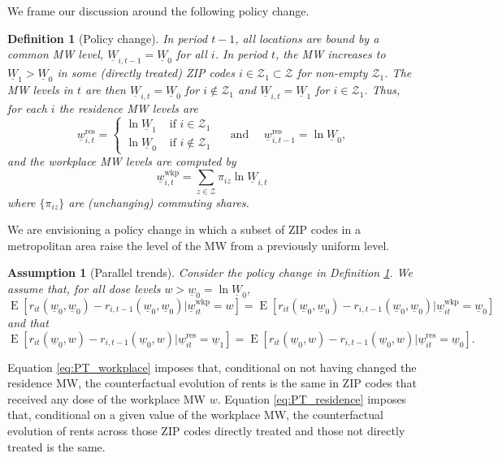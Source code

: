 \documentclass{article}
\newtheorem{assu}{Assumption}
\newtheorem{definition}{Definition}
\newcommand{\Z}{\mathcal{Z}}
\newcommand{\MW}{\underline{W}}
\newcommand{\mw}{\underline{w}}
\newcommand{\wkp}{\text{wkp}}
\newcommand{\res}{\text{res}}
\DeclareMathOperator{\E}{E}
\begin{document}
We frame our discussion around the following policy change.

\begin{definition}[Policy change]\label{def:policy_change}
    In period $t-1$, all locations are bound by a common MW level, 
    $\MW_{i,t-1}=\MW_0$ for all $i$.
    In period $t$, the MW increases to $\MW_1>\MW_0$ in some 
    (directly treated) ZIP codes $i\in\Z_1\subset\Z$ for non-empty $\Z_1$.
    The MW levels in $t$ are then 
    $\MW_{i,t}=\MW_0$ for $i\notin\Z_1$ and
    $\MW_{i,t}=\MW_1$ for $i\in\Z_1$.
    Thus, for each $i$ the residence MW levels are
    $$
    \mw_{i,t}^{\res} = 
    \begin{cases}
        \ln \MW_1 & \text{ if } i\in\Z_1 \\
        \ln \MW_0 & \text{ if } i\notin\Z_1 
    \end{cases}
    \quad\text{ and }\quad
    \mw_{i,t-1}^{\res} = \ln \MW_0 ,
    $$
    and the workplace MW levels are computed by
    $$
    \mw_{i,t}^{\wkp} = \sum_{z\in\Z} \pi_{iz} \ln \MW_{i,t}
    $$
    where $\{\pi_{iz}\}$ are (unchanging) commuting shares.
\end{definition}

We are envisioning a policy change in which a subset of ZIP codes in a metropolitan 
area raise the level of the MW from a previously uniform level.

\begin{assu}[Parallel trends] \label{assu:PT}
    Consider the policy change in Definition \ref{def:policy_change}.
    We assume that, for all dose levels $w>\mw_0 = \ln \MW_0$,
    \begin{equation}\label{eq:PT_workplace}
        \E\left[r_{it}(\mw_0, \mw_0) - r_{i,t-1}(\mw_0, \mw_0) \big| \mw_{it}^{\wkp} = w \right] 
        = \E\left[r_{it}(\mw_0, \mw_0) - r_{i,t-1}(\mw_0, \mw_0) \big| \mw_{it}^{\wkp} = \mw_0 \right] 
    \end{equation}
    and that
    \begin{equation}\label{eq:PT_residence}
        \E\left[r_{it}(\mw_0, w) - r_{i,t-1}(\mw_0, w) \big| \mw_{it}^{\res} = \mw_1 \right] 
        = \E\left[r_{it}(\mw_0, w) - r_{i,t-1}(\mw_0, w) \big| \mw_{it}^{\res} = \mw_0 \right] .
    \end{equation}
\end{assu}

Equation \eqref{eq:PT_workplace} imposes that, conditional on not having changed
the residence MW, the counterfactual evolution of rents is the same in ZIP codes
that received any dose of the workplace MW $w$.
Equation \eqref{eq:PT_residence} imposes that, conditional on a given value of
the workplace MW, the counterfactual evolution of rents across those ZIP codes
directly treated and those not directly treated is the same.
\end{document}
